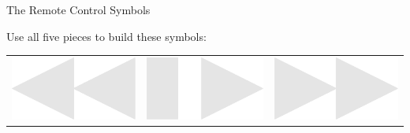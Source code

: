\documentclass[14pt]{beamer}
\begin{document}
    \begin{frame}{The Remote Control Symbols}
        \begin{center}
            Use all five pieces to build these symbols:

            \bigskip\bigskip

            \begin{tabular}{ccc}
                      \includegraphics[scale=0.2]{figures/figure026i.pdf} \quad&
                 \quad\includegraphics[scale=0.2]{figures/figure026j.pdf} \quad&
                 \quad\includegraphics[scale=0.2]{figures/figure026k.pdf} \\

\end{tabular}
\end{center}
\end{frame}
\end{document}
